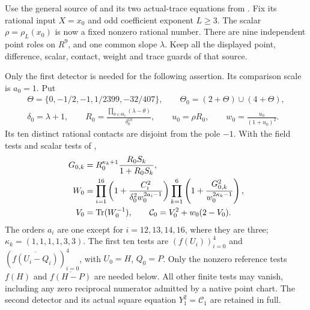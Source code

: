 \documentclass[11pt,a4paper]{article}
\begin{document}
Use the general source of \cite[Section 1]{Reweighted} and its
two actual-trace equations from \cite{TwoTrace}. Fix its rational
input $X=x_0$ and odd coefficient exponent $L\ge3$. The scalar
$\rho=\rho_L(x_0)$ is now a fixed nonzero rational number.
There are nine independent point roles on $R^9$, and one common
slope $\lambda$. Keep all the displayed point, difference,
scalar, contact, weight and trace guards of that source.

Only the first detector is needed for the following assertion.
Its comparison scale is $a_0=1$. Put
\[
 \begin{gathered}
 \Theta=\{0,-1/2,-1,1/2399,-32/407\},\qquad
 \Theta_0=(2+\Theta)\cup(4+\Theta),\\
 \delta_0=\lambda+1,\qquad
 R_0=\frac{\prod_{\theta\in\Theta_0}(\lambda-\theta)}
             {\delta_0^{10}},\qquad
 u_0=\rho R_0,\qquad w_0=\frac{u_0}{(1+u_0)^2}.
 \end{gathered}
\]
Its ten distinct rational contacts are disjoint from the pole $-1$.
With the field tests and scalar tests of \cite{Reweighted},
\[
 \begin{split}
 G_{0,k}&=R_0^{\kappa_k+1}\frac{R_0S_k}{1+R_0S_k},\\
 W_0&=\prod_{i=1}^{16}
       \left(1+\frac{C_i^2}{\delta_0^2w_0^{2a_i-1}}\right)
       \prod_{k=1}^{6}
       \left(1+\frac{G_{0,k}^2}{w_0^{2\kappa_k-1}}\right),\\
 V_0&=\operatorname{Tr}(W_0^{-1}),\qquad
 \mathcal C_0=V_0^2+w_0(2-V_0).
 \end{split}
\]
The orders $a_i$ are one except for $i=12,13,14,16$, where
they are three; $\kappa_k=(1,1,1,1,3,3)$.
The first ten tests are
$(f(U_i))_{i=0}^{4}$ and
$(\overline{f(U_i-Q_i)})_{i=0}^{4}$, with $U_0=H$, $Q_0=P$.
Only the nonzero reference tests $f(H)$ and
$\overline{f(H-P)}$ are needed below. All other finite tests may
vanish, including any zero reciprocal numerator admitted by a native
point chart. The second detector and its actual square equation
$Y_1^2=\mathcal C_1$ are retained in full.
\end{document}
